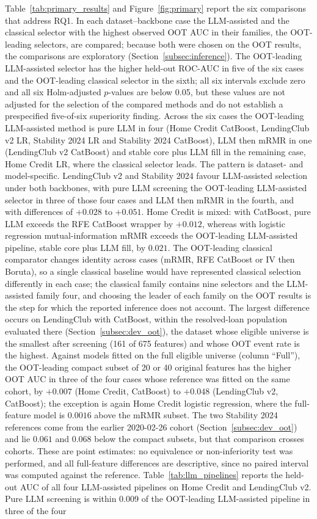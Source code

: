 \documentclass[final,5p,twocolumn]{elsarticle}
\begin{document}
Table~\ref{tab:primary_results} and Figure~\ref{fig:primary} report the six comparisons that address RQ1. In each dataset--backbone case the LLM-assisted and the classical selector with the highest observed OOT AUC in their families, the OOT-leading selectors, are compared; because both were chosen on the OOT results, the comparisons are exploratory (Section~\ref{subsec:inference}). The OOT-leading LLM-assisted selector has the higher held-out ROC-AUC in five of the six cases and the OOT-leading classical selector in the sixth; all six intervals exclude zero and all six Holm-adjusted $p$-values are below 0.05, but these values are not adjusted for the selection of the compared methods and do not establish a prespecified five-of-six superiority finding. Across the six cases the OOT-leading LLM-assisted method is pure LLM in four (Home Credit CatBoost, LendingClub v2 LR, Stability 2024 LR and Stability 2024 CatBoost), LLM then mRMR in one (LendingClub v2 CatBoost) and stable core plus LLM fill in the remaining case, Home Credit LR, where the classical selector leads. The pattern is dataset- and model-specific. LendingClub v2 and Stability 2024 favour LLM-assisted selection under both backbones, with pure LLM screening the OOT-leading LLM-assisted selector in three of those four cases and LLM then mRMR in the fourth, and with differences of $+0.028$ to $+0.051$. Home Credit is mixed: with CatBoost, pure LLM exceeds the RFE CatBoost wrapper by $+0.012$, whereas with logistic regression mutual-information mRMR exceeds the OOT-leading LLM-assisted pipeline, stable core plus LLM fill, by $0.021$. The OOT-leading classical comparator changes identity across cases (mRMR, RFE CatBoost or IV then Boruta), so a single classical baseline would have represented classical selection differently in each case; the classical family contains nine selectors and the LLM-assisted family four, and choosing the leader of each family on the OOT results is the step for which the reported inference does not account. The largest difference occurs on LendingClub with CatBoost, within the resolved-loan population evaluated there (Section~\ref{subsec:dev_oot}), the dataset whose eligible universe is the smallest after screening (161 of 675 features) and whose OOT event rate is the highest. Against models fitted on the full eligible universe (column ``Full''), the OOT-leading compact subset of 20 or 40 original features has the higher OOT AUC in three of the four cases whose reference was fitted on the same cohort, by $+0.007$ (Home Credit, CatBoost) to $+0.048$ (LendingClub v2, CatBoost); the exception is again Home Credit logistic regression, where the full-feature model is $0.0016$ above the mRMR subset. The two Stability 2024 references come from the earlier 2020-02-26 cohort (Section~\ref{subsec:dev_oot}) and lie $0.061$ and $0.068$ below the compact subsets, but that comparison crosses cohorts. These are point estimates: no equivalence or non-inferiority test was performed, and all full-feature differences are descriptive, since no paired interval was computed against the reference. Table~\ref{tab:llm_pipelines} reports the held-out AUC of all four LLM-assisted pipelines on Home Credit and LendingClub v2. Pure LLM screening is within 0.009 of the OOT-leading LLM-assisted pipeline in three of the four 
\end{document}
